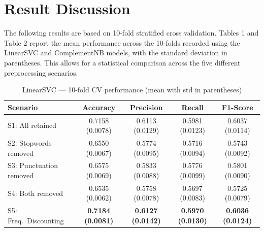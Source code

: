 \documentclass[a4paper,10pt]{article}
\begin{document}
\section{Result Discussion}
 The following results are based on 10-fold stratified cross validation. Tables 1 and Table 2 report the mean performance across the 10-folds recorded using the LinearSVC and ComplementNB models, with the standard deviation in parentheses. This allows for a statistical comparison across the five different preprocessing scenarios.

\begin{table}[H]
\centering
\label{tab:svm_cv_results}
\begin{tabular}{|p{5.2cm}|c|c|c|c|}
\hline
\textbf{Scenario} & \textbf{Accuracy} & \textbf{Precision} & \textbf{Recall} & \textbf{F1-Score} \\
\hline
S1: All retained          & 0.7158 (0.0078) & 0.6113 (0.0129) & 0.5981 (0.0123) & 0.6037 (0.0114) \\
\hline
S2: Stopwords removed     & 0.6550 (0.0067) & 0.5774 (0.0095) & 0.5716 (0.0094) & 0.5743 (0.0092) \\
\hline
S3: Punctuation removed   & 0.6575 (0.0069) & 0.5833 (0.0088) & 0.5776 (0.0099) & 0.5801 (0.0090) \\
\hline
S4: Both removed          & 0.6535 (0.0062) & 0.5758 (0.0078) & 0.5697 (0.0083) & 0.5725 (0.0079) \\
\hline
S5: Freq.\ Discounting    & \textbf{0.7184 (0.0081)} & \textbf{0.6127 (0.0142)} & \textbf{0.5970 (0.0130)} & \textbf{0.6036 (0.0124)} \\
\hline
\end{tabular}
\caption{LinearSVC — 10-fold CV performance (mean with std in parentheses)}
\end{table}
\end{document}
